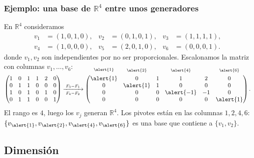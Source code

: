\begin{frame}
    \frametitle{Ejemplo: una base de \(\mathbb{R}^4\) entre unos generadores}

    \begin{example}
        En \(\mathbb{R}^4\) consideramos
        \[
            \begin{aligned}
                v_1&=(1,0,1,0), & v_2&=(0,1,0,1), & v_3&=(1,1,1,1),\\
                v_4&=(1,0,0,0), & v_5&=(2,0,1,0), & v_6&=(0,0,0,1).
            \end{aligned}
        \]
        donde \(v_1,v_2\) son independientes por no ser proporcionales.
        Escalonamos la matriz con columnas \(v_1,\ldots,v_6\):
        \[
            \begin{pmatrix}
                1&0&1&1&2&0\\
                0&1&1&0&0&0\\
                1&0&1&0&1&0\\
                0&1&1&0&0&1
            \end{pmatrix}
            \xrightarrow[\;F_4-F_2\;]{\;F_3-F_1\;}
            \begin{pmatrix}
                \smash{\overset{\raisebox{1.5ex}{$\scriptstyle\alert{1}$}}{\alert{1}}}&\smash{\overset{\raisebox{1.5ex}{$\scriptstyle\alert{2}$}}{0}}&1&\smash{\overset{\raisebox{1.5ex}{$\scriptstyle\alert{4}$}}{1}}&2&\smash{\overset{\raisebox{1.5ex}{$\scriptstyle\alert{6}$}}{0}}\\
                0&\alert{1}&1&0&0&0\\
                0&0&0&\alert{-1}&-1&0\\
                0&0&0&0&0&\alert{1}
            \end{pmatrix}.
        \]
        El rango es \(4\), luego los \(v_j\) generan \(\mathbb{R}^4\).
        Los pivotes están en las columnas \(1,2,4,6\):
        \(\{v_{\alert{1}},v_{\alert{2}},v_{\alert{4}},v_{\alert{6}}\}\) es una base que contiene a \(\{v_1,v_2\}\).
    \end{example}
\end{frame}



\subsection{Dimensión}

